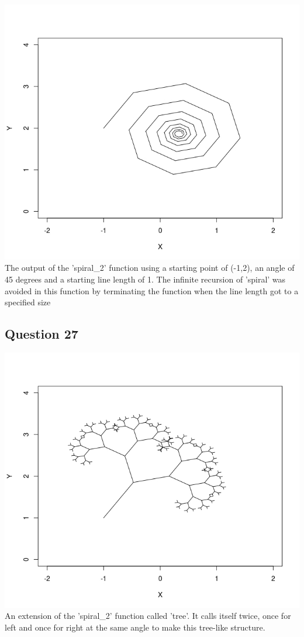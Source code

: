 \documentclass{article}
\begin{document}
\begin{center}
  \includegraphics[width=\textwidth]{../Results/question_26.jpeg}
   {The output of the 'spiral\_2' function using a starting point of 
  (-1,2), an angle of 45 degrees and a starting line length of 1. The infinite recursion of
  'spiral' was avoided in this function by terminating the function when the line length got
  to a specified size}
\end{center}

\subsection*{Question 27}
\begin{center}
  \includegraphics[width=\textwidth]{../Results/question_27.jpeg}
   {An extension of the 'spiral\_2' function called 'tree'.
  It calls itself twice, once for left and once for right at the same angle
  to make this tree-like structure.}
\end{center}
\end{document}
